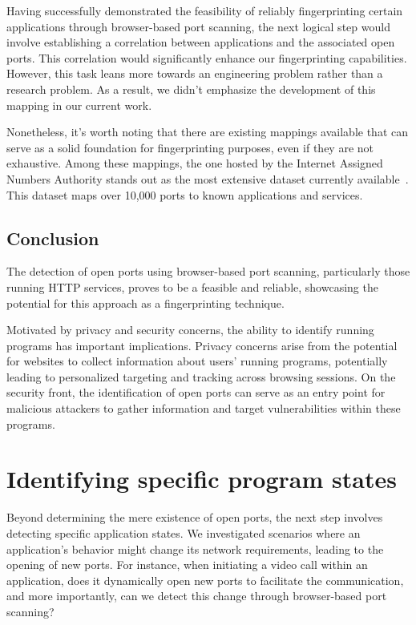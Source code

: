 Having successfully demonstrated the feasibility of reliably fingerprinting certain applications through browser-based port scanning, the next logical step would involve establishing a correlation between applications and the associated open ports. This correlation would significantly enhance our fingerprinting capabilities. However, this task leans more towards an engineering problem rather than a research problem. As a result, we didn't emphasize the development of this mapping in our current work.

Nonetheless, it's worth noting that there are existing mappings available that can serve as a solid foundation for fingerprinting purposes, even if they are not exhaustive. Among these mappings, the one hosted by the Internet Assigned Numbers Authority stands out as the most extensive dataset currently available~. This dataset maps over 10,000 ports to known applications and services.

\subsection{Conclusion}

The detection of open ports using browser-based port scanning, particularly those running HTTP services, proves to be a feasible and reliable, showcasing the potential for this approach as a fingerprinting technique. 

Motivated by privacy and security concerns, the ability to identify running programs has important implications. Privacy concerns arise from the potential for websites to collect information about users' running programs, potentially leading to personalized targeting and tracking across browsing sessions. On the security front, the identification of open ports can serve as an entry point for malicious attackers to gather information and target vulnerabilities within these programs. 

\section{Identifying specific program states}

Beyond determining the mere existence of open ports, the next step involves detecting specific application states. We investigated scenarios where an application's behavior might change its network requirements, leading to the opening of new ports. For instance, when initiating a video call within an application, does it dynamically open new ports to facilitate the communication, and more importantly, can we detect this change through browser-based port scanning? 

